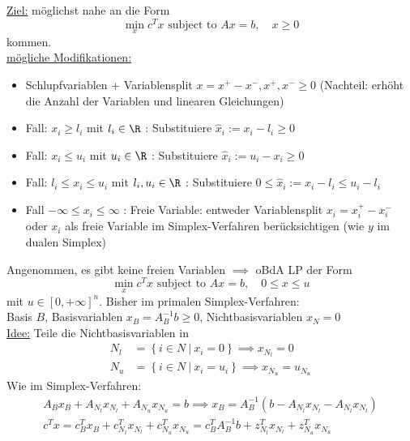 %
\underline{Ziel:} möglichst nahe an die Form
\begin{equation*}
	\min_{x} c^{T} x \text{ subject to } Ax = b ,\quad x \geq 0
\end{equation*}
kommen.\\
\underline{mögliche Modifikationen:}
\begin{itemize}
	\item Schlupfvariablen + Variablensplit $x = x^+ -x^-, x^+,x^- \geq0 $ (Nachteil: erhöht die Anzahl der Variablen und linearen Gleichungen)
	\item Fall: $x_{i} \geq l_{i}$ mit $l_{i}\in \R$ : Substituiere $\hat{x}_{i} := x_{i}- l_{i}\geq 0$
	\item Fall: $x_{i} \leq u_{i}$ mit $u_{i}\in \R$ : Substituiere  $\hat{x}_{i} := u_{i}- x_{i}\geq 0$
	\item Fall: $l_{i} \leq x_{i} \leq u_{i}$ mit $l_{i},u_{i} \in \R$ : Substituiere $0 \leq \hat{x}_{i} := x_{i}- l_{i} \leq u_{i}-l_{i}$
	\item Fall $-\infty \leq x_{i} \leq \infty$ : Freie Variable: entweder Variablensplit $x_{i}= x_{i}^+ - x_{i}^-$ oder $x_{i}$ als freie Variable im Simplex-Verfahren berücksichtigen (wie $y$ im dualen Simplex)
\end{itemize}
Angenommen, es gibt keine freien Variablen $\implies$ oBdA LP der Form
\begin{equation*}
	\min_{x} c^{T} x \text{ subject to } Ax = b, \quad 0 \leq x \leq u
\end{equation*}
mit $u \in [0, + \infty]^n$.\nl
Bisher im primalen Simplex-Verfahren:\\
Basis $B$, Basisvariablen $x_{B}= A_{B}^{-1} b \geq 0$, Nichtbasisvariablen $x_{N}=0$ \\
\underline{Idee:} Teile die Nichtbasisvariablen in
\begin{align*}
	N_{l} &= \left\{ i \in N \ | \ x_{i} = 0  \right\} \implies x_{N_{l}}=0\\
	N_{u} &= \left\{ i \in N \ | \ x_{i} = u_{i}  \right\} \implies x_{N_{u}}=u_{N_{u}}
\end{align*}
Wie im Simplex-Verfahren:
\begin{align*}
	A_{B}x_{B} + A_{N_{l}}x_{N_{l}} + A_{N_{u}} x_{N_{u}} = b \implies x_{B} = A_{B}^{-1} (b - A_{N_{l}} x_{N_{l}} - A_{N_{l}}x_{N_{l}})\\
	c^{T} x = c_{B}^{T} x_{B} + c_{N_{l}}^{T} x_{N_{l}}+c_{N_{u}}^{T} x_{N_{u}} = c_{B}^{T} A_{B}^{-1} b + z_{N_{l}}^{T} x_{N_{l}} + z_{N_{u}}^{T} x_{N_{u}}
\end{align*}
